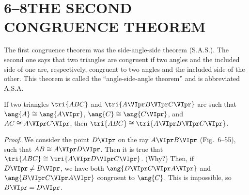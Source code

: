 \documentclass[11pt]{book}
\theoremstyle{bkplain}
\theoremstyle{XIplainnote}
\theoremstyle{bkplain}
\theoremstyle{bkplain}
\begin{document}
\section*{6--8\quad THE SECOND CONGRUENCE THEOREM}

The first congruence theorem was the side-angle-side theorem (S.A.S.). The
second one says that two triangles are congruent if two angles and the included
side of one are, respectively, congruent to two angles and the included side of
the other. This theorem is called the ``angle-side-angle theorem'' and is
abbreviated A.S.A.

\begin{theorem}
If two triangles $\tri{ABC}$ and $\tri{A\VIpr B\VIpr C\VIpr}$ are such that
$\ang{A} \cong \ang{A\VIpr}$, $\ang{C} \cong \ang{C\VIpr}$, and $AC \cong
A\VIpr C\VIpr$, then $\tri{ABC} \cong \tri{A\VIpr B\VIpr C\VIpr}$.
\end{theorem}

\FIGVIFIFTYFIVE

\emph{Proof.} We consider the point $D\VIpr$ on the ray $A\VIpr B\VIpr$
(Fig.~6--55), such that $AB \cong A\VIpr D\VIpr$. Then it is true that
$\tri{ABC} \cong \tri{A\VIpr D\VIpr C\VIpr}$. (Why?) Then, if $D\VIpr \neq
B\VIpr$, we have both $\ang{D\VIpr C\VIpr A\VIpr}$ and $\ang{B\VIpr C\VIpr
A\VIpr}$ congruent to $\ang{C}$. This is impossible, so $B\VIpr = D\VIpr$.

\begin{steps}
\end{steps}
\end{document}

